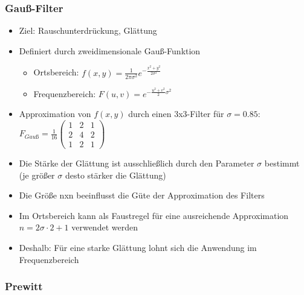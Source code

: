 \subsubsection{Gauß-Filter}
\begin{itemize}
  \item Ziel: Rauschunterdrückung, Glättung
  \item Definiert durch zweidimensionale Gauß-Funktion
	
	\begin{itemize}
		\item Ortsbereich: $f(x,y) = \frac{1}{2 \pi \sigma^2} e^{-\frac{x^2 + y^2}{2\sigma^2}}$
		\item Frequenzbereich: $F(u,v)=e^{-\frac{u^2 + v^2}{2}\sigma^2}$
	\end{itemize}
	
	\item Approximation von $f(x,y)$ durch einen 3x3-Filter für $\sigma=0.85$: $F_{Gauß}=\frac{1}{16} \left(
	\begin{array}{ccc}
	1 & 2 & 1 \\
	2 & 4 & 2 \\
	1 & 2 & 1
	\end{array} \right)
	$
	
	\item Die Stärke der Glättung ist ausschließlich durch den Parameter $\sigma$ bestimmt (je größer $\sigma$ desto stärker die Glättung)
	\item Die Größe nxn beeinflusst die Güte der Approximation des Filters
	\item Im Ortsbereich kann als Faustregel für eine ausreichende Approximation $n=2\sigma \cdot 2 +1 $ verwendet werden
	\item Deshalb: Für eine starke Glättung lohnt sich die Anwendung im Frequenzbereich
\end{itemize}



\subsubsection{Prewitt}

